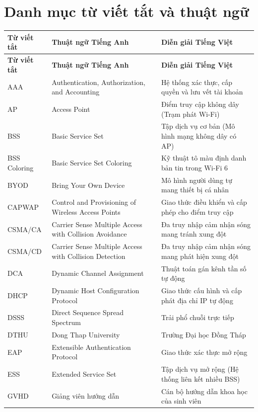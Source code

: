 \chapter*{Danh mục từ viết tắt và thuật ngữ}

\begin{xltabular}{\textwidth}{lp{4.2cm}X}
\toprule
\textbf{Từ viết tắt} & \textbf{Thuật ngữ Tiếng Anh} & \textbf{Diễn giải Tiếng Việt} \\
\midrule
\endfirsthead
\toprule
\textbf{Từ viết tắt} & \textbf{Thuật ngữ Tiếng Anh} & \textbf{Diễn giải Tiếng Việt} \\
\midrule
\endhead
\bottomrule
\endfoot
\bottomrule
\endlastfoot

AAA & Authentication, Authorization, and Accounting & Hệ thống xác thực, cấp quyền và lưu vết tài khoản \\
AP & Access Point & Điểm truy cập không dây (Trạm phát Wi-Fi) \\
BSS & Basic Service Set & Tập dịch vụ cơ bản (Mô hình mạng không dây có AP) \\
BSS Coloring & Basic Service Set Coloring & Kỹ thuật tô màu định danh bản tin trong Wi-Fi 6 \\
BYOD & Bring Your Own Device & Mô hình người dùng tự mang thiết bị cá nhân \\
CAPWAP & Control and Provisioning of Wireless Access Points & Giao thức điều khiển và cấp phép cho điểm truy cập \\
CSMA/CA & Carrier Sense Multiple Access with Collision Avoidance & Đa truy nhập cảm nhận sóng mang tránh xung đột \\
CSMA/CD & Carrier Sense Multiple Access with Collision Detection & Đa truy nhập cảm nhận sóng mang phát hiện xung đột \\
DCA & Dynamic Channel Assignment & Thuật toán gán kênh tần số tự động \\
DHCP & Dynamic Host Configuration Protocol & Giao thức cấu hình và cấp phát địa chỉ IP tự động \\
DSSS & Direct Sequence Spread Spectrum & Trải phổ chuỗi trực tiếp \\
DTHU & Dong Thap University & Trường Đại học Đồng Tháp \\
EAP & Extensible Authentication Protocol & Giao thức xác thực mở rộng \\
ESS & Extended Service Set & Tập dịch vụ mở rộng (Hệ thống liên kết nhiều BSS) \\
GVHD & Giảng viên hướng dẫn & Cán bộ hướng dẫn khoa học của sinh viên \\

\end{xltabular}
